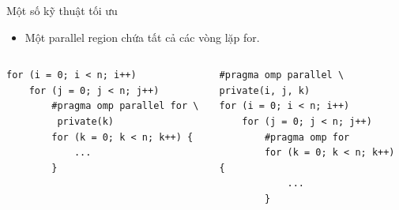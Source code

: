 \documentclass[10pt]{beamer}
\theoremstyle{remark}
\numberwithin{algocf}{section}
\numberwithin{equation}{section}
\numberwithin{dl}{section}
\numberwithin{figure}{section}
\begin{document}
\begin{frame}{Một số kỹ thuật tối ưu}
    \begin{itemize}
        \item Một parallel region chứa tất cả các vòng lặp for.
    \end{itemize}
    \begin{columns}[onlytextwidth]
        \begin{column}{0.5\linewidth}
            \begin{verbatim}
for (i = 0; i < n; i++)
    for (j = 0; j < n; j++)
        #pragma omp parallel for \ 
         private(k)
        for (k = 0; k < n; k++) {
            ...
        }
            \end{verbatim}
        \end{column}
        \begin{column}{0.5\linewidth}
            \begin{verbatim}
#pragma omp parallel \
private(i, j, k)
for (i = 0; i < n; i++)
    for (j = 0; j < n; j++)
        #pragma omp for
        for (k = 0; k < n; k++) {
            ...
        }
            \end{verbatim}
        \end{column}
    \end{columns}
\end{frame}
\end{document}
